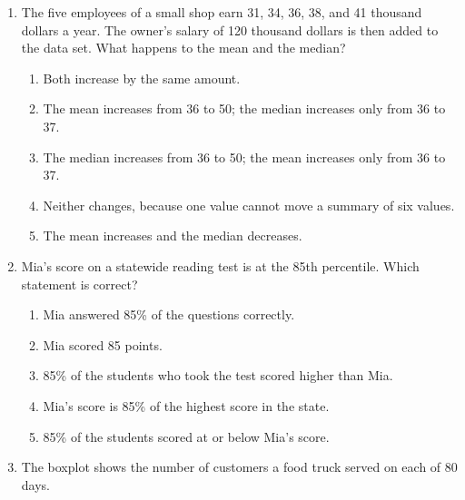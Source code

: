 \documentclass[12pt]{article}
\begin{document}
\begin{enumerate}[leftmargin=1.9em, itemsep=0.13in]
  \boxguard[11]
  \item The five employees of a small shop earn 31, 34, 36, 38, and 41 thousand dollars a
        year. The owner's salary of 120 thousand dollars is then added to the data set. What
        happens to the mean and the median?
        \begin{enumerate}[label=\textbf{(\Alph*)}, leftmargin=2.2em, itemsep=2pt]
          \item Both increase by the same amount.
          \item The mean increases from 36 to 50; the median increases only from 36 to 37.
          \item The median increases from 36 to 50; the mean increases only from 36 to 37.
          \item Neither changes, because one value cannot move a summary of six values.
          \item The mean increases and the median decreases.\hfill{}\rule[-0.2in]{0pt}{0.48in}
        \end{enumerate}

  \boxguard[10]
  \item Mia's score on a statewide reading test is at the 85th percentile. Which statement is
        correct?
        \begin{enumerate}[label=\textbf{(\Alph*)}, leftmargin=2.2em, itemsep=2pt]
          \item Mia answered 85\% of the questions correctly.
          \item Mia scored 85 points.
          \item 85\% of the students who took the test scored higher than Mia.
          \item Mia's score is 85\% of the highest score in the state.
          \item 85\% of the students scored at or below Mia's score.\hfill{}\rule[-0.2in]{0pt}{0.48in}
        \end{enumerate}

  \boxguard[16]
  \item The boxplot shows the number of customers a food truck served on each of 80 days.


\end{enumerate}
\end{document}
